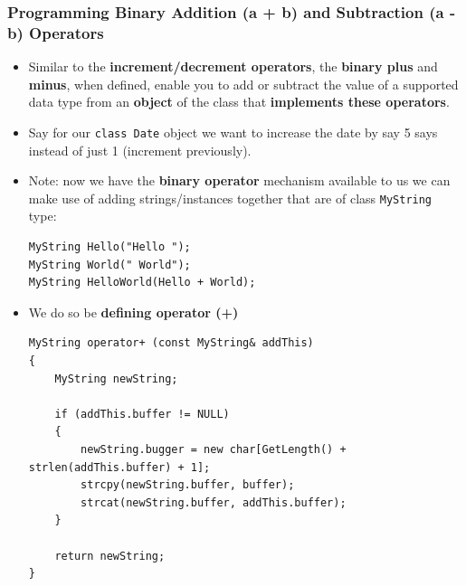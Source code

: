 \documentclass[10pt]{article}
\newcommand{\pbreak}{\vspace{30pt}}
\begin{document}
\newpage

\subsubsection{Programming Binary Addition (a + b) and Subtraction (a - b) Operators}
\begin{itemize}
	\item Similar to the \textbf{increment/decrement operators}, the \textbf{binary plus} and \textbf{minus}, when defined, enable you to add or subtract the value of a supported data type from an \textbf{object} of the class that \textbf{implements these operators}.

	\item Say for our \verb|class Date| object we want to increase the date by say 5 says instead of just 1 (increment previously).


	\pbreak

\item Note: now we have the \textbf{binary operator} mechanism available to us we can make use of adding strings/instances together that are of class \verb|MyString| type:

	\begin{verbatim}
MyString Hello("Hello ");
MyString World(" World");
MyString HelloWorld(Hello + World);
	\end{verbatim}

\item We do so be \textbf{defining operator (+)}
	\begin{verbatim}
MyString operator+ (const MyString& addThis)
{
	MyString newString;

	if (addThis.buffer != NULL)
	{
		newString.bugger = new char[GetLength() + strlen(addThis.buffer) + 1];
		strcpy(newString.buffer, buffer);
		strcat(newString.buffer, addThis.buffer);
	}	

	return newString;
}
	\end{verbatim}
\end{itemize}

\newpage
\end{document}
